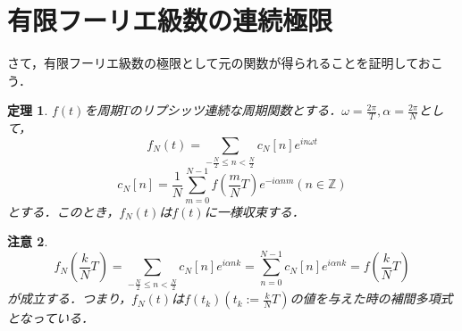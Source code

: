\documentclass[a4j]{jsbook}
\newtheorem{theorem}{定理}
\newtheorem{rem}[theorem]{注意}
\numberwithin{theorem}{chapter}  %
\begin{document}
\section{有限フーリエ級数の連続極限} \label{sec1-7}
さて，有限フーリエ級数の極限として元の関数が得られることを証明しておこう．
\begin{theorem}
\label{th1-5}
\(f(t)\)を周期\(T\)のリプシッツ連続な周期関数とする．\(\displaystyle\omega=\frac{2\pi}{T}, \alpha=\frac{2\pi}{N}\)として，
\begin{equation*}
    f_N(t)=\sum_{-\frac{N}{2}\leq n<\frac{N}{2}} c_N[n]e^{in\omega t}
\end{equation*}
\begin{equation*}
    c_N[n]=\frac{1}{N}\sum_{m=0}^{N-1}f\left(\frac{m}{N}T\right)e^{-i\alpha nm} (n\in\mathbb{Z})
\end{equation*}
とする．このとき，\(f_N(t)\)は\(f(t)\)に一様収束する．
\end{theorem}
\begin{rem}
\label{rem1-1}
\begin{equation*}
    f_N\left(\frac{k}{N}T\right)=\sum_{-\frac{N}{2}\leq n<\frac{N}{2}}c_N[n]e^{i\alpha nk}=\sum_{n=0}^{N-1}c_N[n]e^{i\alpha nk}=f\left(\frac{k}{N}T\right)
\end{equation*}
が成立する．つまり，\(f_N(t)\)は\(\displaystyle f(t_k)\left(t_k:=\frac{k}{N}T\right)\)の値を与えた時の補間多項式となっている．
\end{rem}
\end{document}
